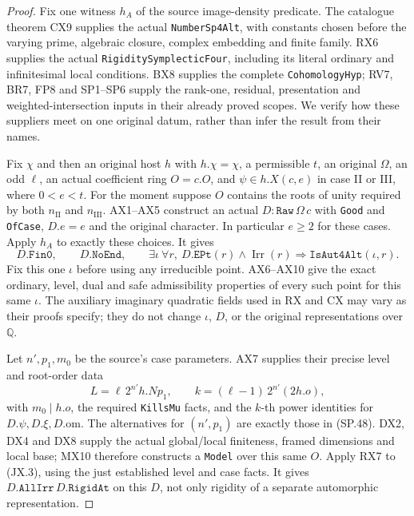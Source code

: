 \begin{proof}
Fix one witness $h_A$ of the source image-density predicate.
The catalogue theorem CX9 supplies the actual
\texttt{NumberSp4Alt}, with constants chosen before the
varying prime, algebraic closure, complex embedding and
finite family.  RX6 supplies the actual
\texttt{RigiditySymplecticFour}, including its literal
ordinary and infinitesimal local conditions.  BX8
supplies the complete \texttt{CohomologyHyp}; RV7, BR7,
FP8 and SP1--SP6 supply the rank-one, residual,
presentation and weighted-intersection inputs in their
already proved scopes.  We verify how these suppliers
meet on one original datum, rather than infer the result
from their names.

Fix $\chi$ and then an original host $h$ with $h.\chi=\chi$,
a permissible $t$, an original $\Omega$, an odd $\ell$,
an actual coefficient ring $O=c.O$, and
$\psi\in h.X(c,e)$ in case II or III, where $0<e<t$.
For the moment suppose $O$ contains the roots of unity
required by both $n_{\mathrm{II}}$ and
$n_{\mathrm{III}}$.  AX1--AX5 construct an actual
$D:\texttt{Raw}\,\Omega\,c$ with \texttt{Good} and
\texttt{OfCase}, $D.e=e$ and the original character.
In particular $e\ge2$ for these cases.  Apply $h_A$
to exactly these choices.  It gives
\[
 D.\texttt{Fin0},\qquad D.\texttt{NoEnd},\qquad
 \exists\iota\ \forall r,\
    D.\texttt{EPt}(r)\wedge\operatorname{Irr}(r)
                  \Longrightarrow\texttt{IsAut4Alt}(\iota,r).
                                                               \tag{JX.3}
\]
Fix this one $\iota$ before using any irreducible point.
AX6--AX10 give the exact ordinary, level, dual and safe
admissibility properties of every such point for this
same $\iota$.  The auxiliary imaginary quadratic fields
used in RX and CX may vary as their proofs specify;
they do not change $\iota$, $D$, or the original
representations over $\mathbb Q$.

Let $n',p_1,m_0$ be the source's case parameters.
AX7 supplies their precise level and root-order data
\[
      L=\ell\,2^{n'}h.Np_1,\qquad
      k=(\ell-1)\,2^{n'}(2h.o),
                                                               \tag{JX.4}
\]
with $m_0\mid h.o$, the required \texttt{KillsMu} facts,
and the $k$-th power identities for
$D.\psi,D.\xi,D.\mathrm{om}$.  The alternatives for
$(n',p_1)$ are exactly those in (SP.48).
DX2, DX4 and DX8 supply the actual global/local
finiteness, framed dimensions and local base;
MX10 therefore constructs a \texttt{Model} over this
same $O$.  Apply RX7 to (JX.3), using the just
established level and case facts.  It gives
$D.\texttt{AllIrr}\,D.\texttt{RigidAt}$ on this $D$,
not only rigidity of a separate automorphic
representation.


\end{proof}

